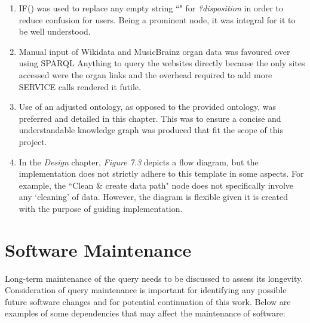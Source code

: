 \begin{enumerate}
    \item IF() was used to replace any empty string ``" for \textit{?disposition} in order to reduce confusion for users. Being a prominent node, it was integral for it to be well understood. 
    \item Manual input of Wikidata and MusicBrainz organ data was favoured over using SPARQL Anything to query the websites directly because the only sites accessed were the organ links and the overhead required to add more SERVICE calls rendered it futile. 
    \item Use of an adjusted ontology, as opposed to the provided ontology, was preferred and detailed in this chapter. This was to ensure a concise and understandable knowledge graph was produced that fit the scope of this project. 
    \item In the \textit{Design} chapter, \textit{Figure 7.3} depicts a flow diagram, but the implementation does not strictly adhere to this template in some aspects. For example, the ``Clean \& create data path" node does not specifically involve any `cleaning' of data. However, the diagram is flexible given it is created with the purpose of guiding implementation. 
\end{enumerate}

\section{Software Maintenance}
\hspace{0.5cm} Long-term maintenance of the query needs to be discussed to assess its longevity. Consideration of query maintenance is important for identifying any possible future software changes and for potential continuation of this work. Below are examples of some dependencies that may affect the maintenance of software:  

